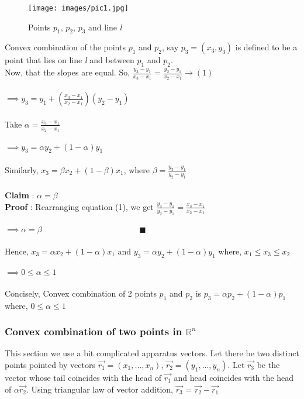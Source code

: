 \documentclass{article}
\newcommand\ddfrac[2]{\frac{\displaystyle #1}{\displaystyle #2}}
\begin{document}
    \begin{figure}[h]
    \caption{Points $p_{1}$, $p_{2}$, $p_{3}$ and line \emph{l}}
    \centering
    \texttt{[image: images/pic1.jpg]}
    \end{figure}

    Convex combination of the points $p_1$ and $p_2$, say $p_{3}=(x_{3},y_{3})$ is defined to be a point that lies on line \emph{l} and between $p_{1}$ and $p_{2}$.\\

    Now, that the slopes are equal. So, $\ddfrac{y_{3}-y_{1}}{x_{3}-x_{1}}=\ddfrac{y_{2}-y_{1}}{x_{2}-x_{1}} \xrightarrow{} (1)$ \\ \\
    $\implies y_{3}=y_{1}+(\ddfrac{x_{3}-x_{1}}{x_{2}-x_{1}})(y_{2}-y_{1})$ \\ \\
    Take $\alpha = \ddfrac{x_{3}-x_{1}}{x_{2}-x_{1}}$ \\ \\
    $\implies y_{3}=\alpha y_{2} + (1-\alpha) y_{1}$ \\ \\
    Similarly, $x_{3}=\beta x_{2} + (1-\beta) x_{1}$, where $\beta=\ddfrac{y_{3}-y_{1}}{y_{2}-y_{1}}$ \\ \\
    \textbf{Claim} : $\alpha = \beta$ \\
    \textbf{Proof} : Rearranging equation (1), we get $\ddfrac{y_{3}-y_{1}}{y_{2}-y_{1}}=\ddfrac{x_{3}-x_{1}}{x_{2}-x_{1}}$ \\ \\
    $\implies \alpha = \beta \hspace{5cm} \blacksquare$ \\ \\
    Hence, $x_{3}=\alpha x_{2} + (1-\alpha) x_{1}$ and $y_{3}=\alpha y_{2} + (1-\alpha) y_{1}$ where, $x_{1} \leq x_{3} \leq x_{2}$ \\ \\
    $\implies 0 \leq \alpha \leq 1$ \\ \\
    Concisely,  Convex combination of 2 points $p_{1}$ and $p_{2}$ is $p_{3} = \alpha p_{2} + (1 - \alpha) p_{1}$ where, $ 0 \leq \alpha \leq 1 $ 

    \subsubsection{\textbf{Convex combination of two points in $\mathbb{R}^{n}$}}
    \hspace{2cm} This section we use a bit complicated apparatus vectors. Let there be two distinct points pointed by vectors $\Vec{r_{1}}=(x_{1},...,x_{n})$, $\Vec{r_{2}}=(y_{1},...,y_{n})$. Let $\Vec{r_{3}}$ be the vector whose tail coincides with the head of $\Vec{r_{1}}$ and head coincides with the head of $\alpha \Vec{r_{2}}$. 
    Using triangular law of vector addition, $\Vec{r_{3}}$ = $\Vec{r_{2}} - \Vec{r_{1}}$
    
\end{document}
